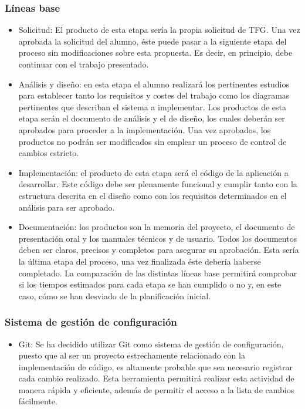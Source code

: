 \documentclass[10pt,a4paper]{article}
\begin{document}
			\subsubsection{Líneas base}
			\begin{itemize}
			    \item Solicitud: El producto de esta etapa sería la propia solicitud de TFG. Una vez aprobada la solicitud del alumno, éste puede pasar a la siguiente etapa del proceso sin modificaciones sobre esta propuesta. Es decir, en principio, debe continuar con el trabajo presentado.
			    \item Análisis y diseño: en esta etapa el alumno realizará los pertinentes estudios para establecer tanto los requisitos y costes del trabajo como los diagramas pertinentes que describan el sistema a implementar. Los productos de esta etapa serán el documento de análisis y el de diseño, los cuales deberán ser aprobados para proceder a la implementación. Una vez aprobados, los productos no podrán ser modificados sin emplear un proceso de control de cambios estricto.
			    \item Implementación: el producto de esta etapa será el código de la aplicación a desarrollar. Este código debe ser plenamente funcional y cumplir tanto con la estructura descrita en el diseño como con los requisitos determinados en el análisis para ser aprobado.
			    \item Documentación: los productos son la memoria del proyecto, el documento de presentación oral y los manuales técnicos y de usuario. Todos los documentos deben ser claros, precisos y completos para asegurar su aprobación. Esta sería la última etapa del proceso, una vez finalizada éste debería haberse completado. La comparación de las distintas líneas base permitirá comprobar si los tiempos estimados para cada etapa se han cumplido o no y, en este caso, cómo se han desviado de la planificación inicial.	    			    
			\end{itemize}
			\subsubsection{Sistema de gestión de configuración}
			\begin{itemize}
			    \item Git: Se ha decidido utilizar Git como sistema de gestión de configuración, puesto que al ser un proyecto estrechamente relacionado con la implementación de código, es altamente probable que sea necesario registrar cada cambio realizado. Esta herramienta permitirá realizar esta actividad de manera rápida y eficiente, además de permitir el acceso a la lista de cambios fácilmente.
			\end{itemize}
\end{document}
